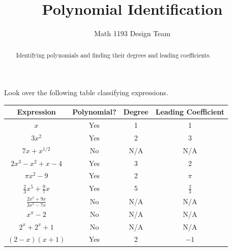 \documentclass[noauthor]{ximera}
\title{Polynomial Identification}
\author{Math 1193 Design Team}
\begin{document}
\begin{abstract}
    Identifying polynomials and finding their degrees and leading coefficients.
\end{abstract}
\maketitle

Look over the following table classifying expressions.

\begin{center}
\begin{tabular}{|c|c|c|c|} 
 \hline
 Expression & Polynomial? & Degree & Leading Coefficient \\
 \hline\hline
 \(x\) & Yes & 1 & 1 \\ 
 \hline
 \(3x^2\) & Yes & 2 & 3 \\
 \hline
 \(7x + x^{1/2}\) & No & N/A & N/A \\
 \hline
 \(2x^3 - x^2 + x - 4\) & Yes & 3 & 2 \\
 \hline
 \(\pi x^2 - 9\) & Yes & 2 & \(\pi\) \\
 \hline
 \(\frac{2}{3}x^5 + \frac{9}{7}x\) & Yes & 5 & \(\frac{2}{3}\) \\
 \hline
 \(\frac{2x^5 + 9x}{3x^5 - 7x}\) & No & N/A & N/A \\
 \hline
 \(x^\pi - 2\) & No & N/A & N/A \\
 \hline
 \(2^x + 2^x + 1\) & No & N/A & N/A \\
 \hline
 \((2 - x)(x + 1)\) & Yes & 2 & \(-1\) \\
 \hline
\end{tabular}
\end{center}
\end{document}
